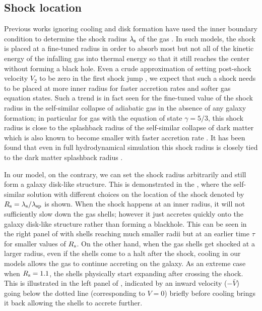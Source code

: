 \subsection{Shock location}
Previous works ignoring cooling and disk formation have used the inner boundary condition to determine the shock radius $\lambda_{\rm s}$ of the gas \cite{1985Bertschinger}. In such models, the shock is placed at a fine-tuned radius in order to absorb most but not all of the kinetic energy of the infalling gas into thermal energy so that it still reaches the center without forming a black hole. Even a crude approximation of setting post-shock velocity $V_2$ to be zero in the first shock jump , we expect that such a shock needs to be placed at more inner radius for faster accretion rates and softer gas equation states. Such a trend is in fact seen for the fine-tuned value of the shock radius in the self-similar collapse of adiabatic gas in the absence of any galaxy formation; in particular for gas with the equation of state $\gamma=5/3$, this shock radius is close to the splashback radius of the self-similar collapse of dark matter which is also known to become smaller with faster accretion rate \cite{2016ShiICM}. It has been found that even in full hydrodynamical simulation this shock radius is closely tied to the dark matter splashback radius \cite{2015LauNagaietal}.

In our model, on the contrary, we can set the shock radius arbitrarily and still form a galaxy disk-like structure. This is demonstrated in the , where the self-similar solution with different choices on the location of the shock denoted by $R_{\rm s} = \lambda_{\rm s}/ \lambda_{\rm sp}$ is shown. When the shock happens at an inner radius, it will not sufficiently slow down the gas shells; however it just accretes quickly onto the galaxy disk-like structure rather than forming a blackhole. This can be seen in the right panel of  with shells reaching much smaller radii but at an earlier time $\tau$ for smaller values of $R_{\rm s}$. On the other hand, when the gas shells get shocked at a larger radius, even if the shells come to a halt after the shock, cooling in our models allows the gas to continue accreting on the galaxy. As an extreme case when $R_{\rm s}=1.1$, the shells physically start expanding after crossing the shock. This is illustrated in the left panel of , indicated by an inward velocity ($-\bar{V}$) going below the dotted line (corresponding to $V=0$) briefly before cooling brings it back allowing the shells to accrete further. 



